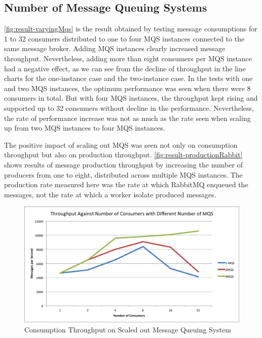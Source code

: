 \subsection{Number of Message Queuing Systems}
  \autoref{fig:result-varyingMqs} is the result obtained by testing message consumptions for 1 to 32 consumers distributed to one to four MQS instances connected to the same message broker. Adding MQS instances clearly increased message throughput. Nevertheless, adding more than eight consumers per MQS instance had a negative effect, as we can see from the decline of throughput in the line charts for the one-instance case and the two-instance case. In the tests with one and two MQS instances, the optimum performance was seen when there were 8 consumers in total. But with four MQS instances, the throughput kept rising and supported up to 32 consumers without decline in the performance. Nevertheless, the rate of performance increase was not as much as the rate seen when scaling up from two MQS instances to four MQS instances.

  The positive impact of scaling out MQS was seen not only on consumption throughput but also on production throughput. \autoref{fig:result-productionRabbit} shows results of message production throughput by increasing the number of producers from one to eight, distributed across multiple MQS instances. The production rate measured here was the rate at which RabbitMQ enqueued the messages, not the rate at which a worker isolate produced messages.
\begin{figure}[H]
  \centering
  \includegraphics[width=1\textwidth]{figures/04varyingMqs}
  \caption[Consumption Throughput on Scaled out Message Queuing System]{Consumption Throughput on Scaled out Message Queuing System}
  \label{fig:result-varyingMqs}
\end{figure}


